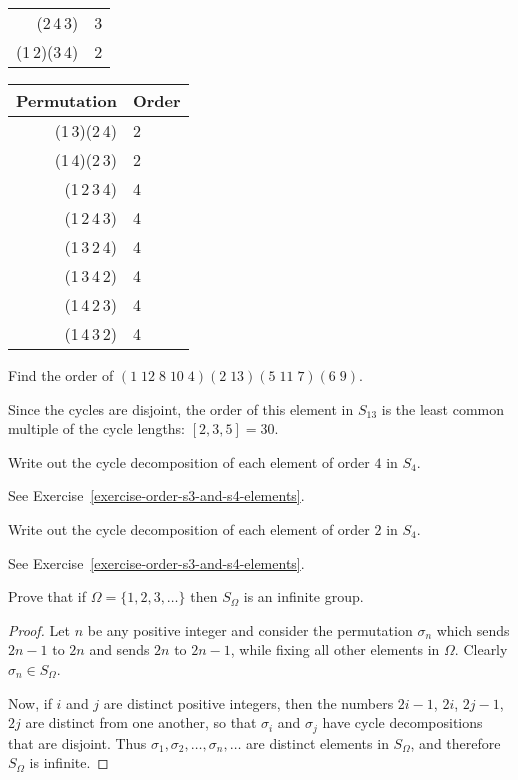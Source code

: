 \begin{enumerate}
\begin{solution}
\begin{center}
\begin{tabular}{r|l}
        (2\,4\,3) & 3 \\
        (1\,2)(3\,4) & 2
      \end{tabular}
      \begin{tabular}{r|l}
        Permutation & Order \\\hline
        (1\,3)(2\,4) & 2 \\
        (1\,4)(2\,3) & 2 \\
        (1\,2\,3\,4) & 4 \\
        (1\,2\,4\,3) & 4 \\
        (1\,3\,2\,4) & 4 \\
        (1\,3\,4\,2) & 4 \\
        (1\,4\,2\,3) & 4 \\
        (1\,4\,3\,2) & 4
      \end{tabular}
    \end{center}
  \end{solution}
\end{enumerate}

 Find the order of
$(1\;12\;8\;10\;4)(2\;13)(5\;11\;7)(6\;9)$.
\begin{solution}
  Since the cycles are disjoint, the order of this element in $S_{13}$
  is the least common multiple of the cycle lengths: $[2,3,5] = 30$.
\end{solution}

 Write out the cycle decomposition of each element of order
$4$ in $S_4$.
\begin{solution}
  See Exercise~\ref{exercise-order-s3-and-s4-elements}.
\end{solution}

 Write out the cycle decomposition of each element of order
$2$ in $S_4$.
\begin{solution}
  See Exercise~\ref{exercise-order-s3-and-s4-elements}.
\end{solution}

 Prove that if $\Omega = \{1,2,3,\dots\}$ then $S_\Omega$ is
an infinite group.
\begin{proof}
  Let $n$ be any positive integer and consider the permutation
  $\sigma_n$ which sends $2n-1$ to $2n$ and sends $2n$ to $2n-1$,
  while fixing all other elements in $\Omega$. Clearly
  $\sigma_n\in S_\Omega$.

  Now, if $i$ and $j$ are distinct positive integers, then the numbers
  $2i-1$, $2i$, $2j-1$, $2j$ are distinct from one another, so that
  $\sigma_i$ and $\sigma_j$ have cycle decompositions that are
  disjoint. Thus $\sigma_1, \sigma_2, \dots, \sigma_n, \dots$ are
  distinct elements in $S_\Omega$, and therefore $S_\Omega$ is
  infinite.
\end{proof}

